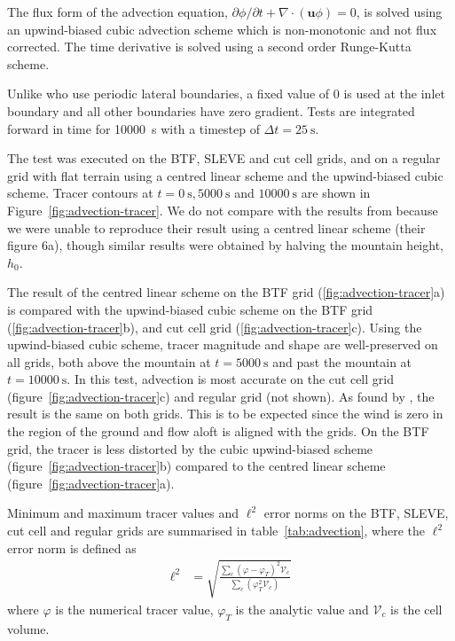 \documentclass[twocol]{ametsoc}
\begin{document}
The flux form of the advection equation, \(\partial \phi / \partial t + \nabla \cdot \left( \bm{u} \phi \right) = 0\), is solved using an upwind-biased cubic advection scheme which is non-monotonic and not flux corrected.  The time derivative is solved using a second order Runge-Kutta scheme.

Unlike \citet{schaer2002} who use periodic lateral boundaries, a fixed value of 0 is used at the inlet boundary and all other boundaries have zero gradient.
Tests are integrated forward in time for \SI{10000}{\second} with a timestep of \(\Delta t = \SI{25}{\second}\).

The test was executed on the BTF, SLEVE and cut cell grids, and on a regular grid with flat terrain using a centred linear scheme and the upwind-biased cubic scheme.  Tracer contours at \(t = \SI{0}{\second}, \SI{5000}{\second}\) and \(\SI{10000}{\second}\) are shown in Figure~\ref{fig:advection-tracer}.  We do not compare with the results from \citet{schaer2002} because we were unable to reproduce their result using a centred linear scheme (their figure 6a), though similar results were obtained by halving the mountain height, \(h_0\).

The result of the centred linear scheme on the BTF grid (\ref{fig:advection-tracer}a) is compared with the upwind-biased cubic scheme on the BTF grid (\ref{fig:advection-tracer}b), and cut cell grid (\ref{fig:advection-tracer}c).
Using the upwind-biased cubic scheme, tracer magnitude and shape are well-preserved on all grids, both above the mountain at \(t = \SI{5000}{\second}\) and past the mountain at \(t = \SI{10000}{\second}\).  In this test, advection is most accurate on the cut cell grid (figure~\ref{fig:advection-tracer}c) and regular grid (not shown).  As found by \citet{good2014}, the result is the same on both grids.  This is to be expected since the wind is zero in the region of the ground and flow aloft is aligned with the grids.  On the BTF grid, the tracer is less distorted by the cubic upwind-biased scheme (figure~\ref{fig:advection-tracer}b) compared to the centred linear scheme (figure~\ref{fig:advection-tracer}a).

Minimum and maximum tracer values and \(\ell^2\) error norms on the BTF, SLEVE, cut cell and regular grids are summarised in table~\ref{tab:advection}, where the \(\ell^2\) error norm is defined as 
\begin{align}
	\ell^2 &= \sqrt{\frac{\sum_c \left( \varphi - \varphi_{T} \right)^2 \mathcal{V}_c}{\sum_c \left( \varphi_T^2 \mathcal{V}_c \right)}}
\end{align}
where $\varphi$ is the numerical tracer value, $\varphi_T$ is the analytic value and $\mathcal{V}_c$ is the cell volume.
\end{document}
